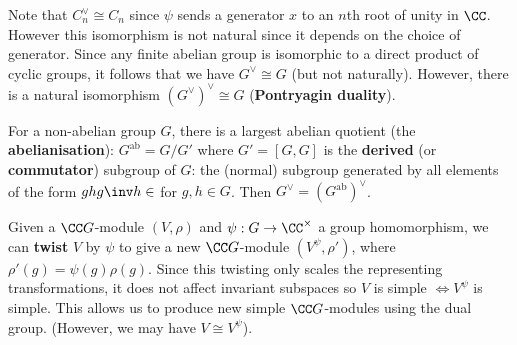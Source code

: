 \begin{rmk}
	Note that $C_n^\vee \cong C_n$ since $\psi$ sends a generator $x$ to an $n$th root of unity in $\CC$.
	However this isomorphism is not natural since it depends on the choice of generator.
	Since any finite abelian group is isomorphic to a direct product of cyclic groups, it follows that we have $G^\vee \cong G$ (but not naturally).
	However, there is a natural isomorphism $(G^\vee)^\vee \cong G$ (\textbf{Pontryagin duality}).
	
	For a non-abelian group $G$, there is a largest abelian quotient (the \textbf{abelianisation}): $G^\text{ab} = G/G'$ where $G'=[G,G]$ is the \textbf{derived} (or \textbf{commutator}) subgroup of $G$: the (normal) subgroup generated by all elements of the form $ghg\inv h\in$ for $g,h \in G$.
	Then $G^\vee=(G^\text{ab})^\vee$.
	
	Given a $\CC G$-module $(V,\rho)$ and $\psi: G \to \CC^\times$ a group homomorphism, we can \textbf{twist} $V$ by $\psi$ to give a new $\CC G$-module $(V^\psi,\rho')$, where $\rho'(g)=\psi(g)\rho(g)$.
	Since this twisting only scales the representing transformations, it does not affect invariant subspaces so $V$ is simple $\iff V^\psi$ is simple.
	This allows us to produce new simple $\CC G$-modules using the dual group.
	(However, we may have $V \cong V^\psi$).
\end{rmk}

